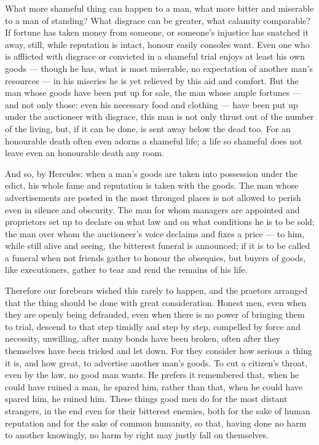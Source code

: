  What more shameful thing can happen to a man, what more bitter and miserable to a man of standing? What disgrace can be greater, what calamity comparable? If fortune has taken money from someone, or someone's injustice has snatched it away, still, while reputation is intact, honour easily consoles want. Even one who is afflicted with disgrace or convicted in a shameful trial enjoys at least his own goods --- though he has, what is most miserable, no expectation of another man's resources --- in his miseries he is yet relieved by this aid and comfort. But the man whose goods have been put up for sale, the man whose ample fortunes — and not only those: even his necessary food and clothing — have been put up under the auctioneer with disgrace, this man is not only thrust out of the number of the living, but, if it can be done, is sent away below the dead too. For an honourable death often even adorns a shameful life; a life so shameful does not leave even an honourable death any room.

 And so, by Hercules: when a man's goods are taken into possession under the edict, his whole fame and reputation is taken with the goods. The man whose advertisements are posted in the most thronged places is not allowed to perish even in silence and obscurity. The man for whom managers are appointed and proprietors set up to declare on what law and on what conditions he is to be sold; the man over whom the auctioneer's voice declaims and fixes a price --- to him, while still alive and seeing, the bitterest funeral is announced; if it is to be called a funeral when not friends gather to honour the obsequies, but buyers of goods, like executioners, gather to tear and rend the remains of his life.

 Therefore our forebears wished this rarely to happen, and the praetors arranged that the thing should be done with great consideration. Honest men, even when they are openly being defrauded, even when there is no power of bringing them to trial, descend to that step timidly and step by step, compelled by force and necessity, unwilling, after many bonds have been broken, often after they themselves have been tricked and let down. For they consider how serious a thing it is, and how great, to advertise another man's goods. To cut a citizen's throat, even by the law, no good man wants. He prefers it remembered that, when he could have ruined a man, he spared him, rather than that, when he could have spared him, he ruined him. These things good men do for the most distant strangers, in the end even for their bitterest enemies, both for the sake of human reputation and for the sake of common humanity, so that, having done no harm to another knowingly, no harm by right may justly fall on themselves.

